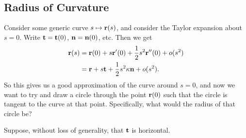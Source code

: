 \documentclass[a4paper]{scrartcl}
\begin{document}
\subsection{Radius of Curvature}

Consider some generic curve $s \mapsto \mathbf{r}(s)$, and consider the Taylor expansion about $s = 0$. Write $\mathbf{t} = \mathbf{t}(0)$, $\mathbf{n} = \mathbf{n}(0)$, etc. Then we get
\begin{align*}
	\mathbf{r}(s) &= \mathbf{r}(0) + s\mathbf{r}'(0) + \frac{1}{2}s^2 \mathbf{r}''(0) + o(s^2) \\
	&= \mathbf{r} + s\mathbf{t} + \frac{1}{2}s^2 \kappa \mathbf{n}	+ o(s^2).
\end{align*}
So this gives us a good approximation of the curve around $s = 0$, and now we want to try and draw a circle through the point $\mathbf{r}(0)$ such that the circle is tangent to the curve at that point. Specifically, what would the radius of that circle be?

Suppose, without loss of generality, that $\mathbf{t}$ is horizontal.
\end{document}
